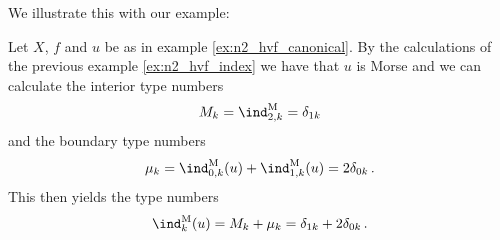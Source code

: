 



We illustrate this with our example:
\begin{example}
  Let $X$, $f$ and $u$ be as in example \ref{ex:n2_hvf_canonical}. By the calculations of the previous example
  \ref{ex:n2_hvf_index} we have that $u$ is Morse and we can calculate the interior type numbers
  \begin{align*}
    M_k=\ind^\text{M}_{2,k}=\delta_{1k}
  \end{align*}
  and the boundary type numbers
  \begin{align*}
    \mu_k=\ind^\text{M}_{0,k}(u)+\ind^\text{M}_{1,k}(u)=2\delta_{0k}\,.
  \end{align*}
  This then yields the type numbers
  \begin{align*}
    \ind^\text{M}_k(u)=M_k+\mu_k=\delta_{1k}+2\delta_{0k}\,.
  \end{align*}
\end{example}

